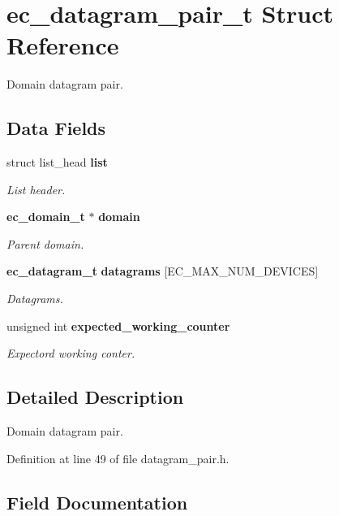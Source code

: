 \section{ec\-\_\-datagram\-\_\-pair\-\_\-t Struct Reference}
\label{structec__datagram__pair__t}


Domain datagram pair.  


\subsection*{Data Fields}
\begin{DoxyCompactItemize}
\item 
struct list\-\_\-head {\bf list}
\begin{DoxyCompactList}\small\item\em List header. \end{DoxyCompactList}\item 
{\bf ec\-\_\-domain\-\_\-t} $\ast$ {\bf domain}
\begin{DoxyCompactList}\small\item\em Parent domain. \end{DoxyCompactList}\item 
{\bf ec\-\_\-datagram\-\_\-t} {\bf datagrams} [E\-C\-\_\-\-M\-A\-X\-\_\-\-N\-U\-M\-\_\-\-D\-E\-V\-I\-C\-E\-S]
\begin{DoxyCompactList}\small\item\em Datagrams. \end{DoxyCompactList}\item 
unsigned int {\bf expected\-\_\-working\-\_\-counter}
\begin{DoxyCompactList}\small\item\em Expectord working conter. \end{DoxyCompactList}\end{DoxyCompactItemize}


\subsection{Detailed Description}
Domain datagram pair. 

Definition at line 49 of file datagram\-\_\-pair.\-h.



\subsection{Field Documentation}
